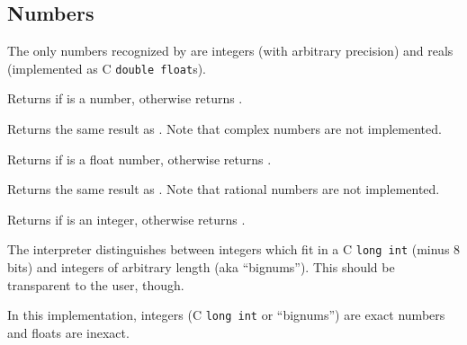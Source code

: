 \subsection {Numbers}

The only numbers recognized by {\stk} are integers (with arbitrary
precision) and reals (implemented as C {\tt double float}s). 

\begin{entry}{%
}
\saut
Returns {\schtrue} if  is a number, otherwise returns {\schfalse}.
\end{entry}

\begin{entry}{%
}
\saut
Returns the same result as .  Note that complex numbers
are not implemented.
\end{entry}

\begin{entry}{%
}
\saut
Returns {\schtrue} if  is a float number, otherwise returns
{\schfalse}.
\end{entry}

\begin{entry}{%
}
\saut
Returns the same result as . Note that rational numbers are not
implemented.
\end{entry}

\begin{entry}{%
}
\saut
Returns {\schtrue} if  is an integer, otherwise returns {\schfalse}.
\begin{note}
  The {\stk} interpreter distinguishes between integers which fit in a
  C {\tt long int} (minus 8 bits) and integers of arbitrary length
  (aka ``bignums''). This should be transparent to the user, though.
\end{note}
\end{entry}

\begin{entry}{%
}
\saut
In this implementation, integers (C {\tt long int} or ``bignums'') are exact
numbers and floats are inexact.
\end{entry}

